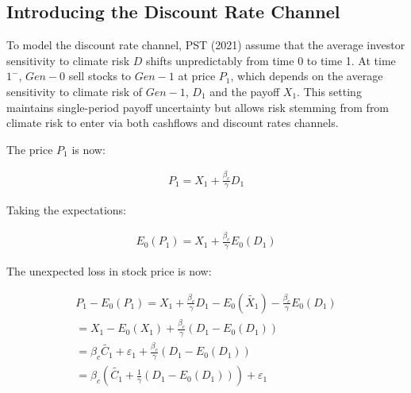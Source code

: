 \subsection{Introducing the Discount Rate Channel}

To model the discount rate channel, PST (2021)
assume that the average investor sensitivity to climate risk 
$D$ shifts unpredictably from time 0 
to time 1. 
At time $1^{-}$, $Gen-0$ sell stocks 
to $Gen-1$ at price $P_1$, which depends 
on the average sensitivity to climate risk
of $Gen-1$, $D_1$ and the payoff $X_1$.
This setting maintains single-period 
payoff uncertainty but allows risk
stemming from from climate risk to enter 
via both cashflows and discount rates 
channels.

The price $P_1$ is now:

\begin{equation}
    \begin{aligned}
    P_1 = X_1 + \frac{\beta_{c}}{\gamma}D_1
    \end{aligned}
\end{equation}

Taking the expectations:

\begin{equation}
    \begin{aligned}
    E_0(P_1) = X_1 + \frac{\beta_{c}}{\gamma}E_0(D_1) 
    \end{aligned}
\end{equation}

The unexpected loss in stock price is now:

\begin{equation}
    \begin{aligned}
    P_1 - E_0(P_1) = X_1 + \frac{\beta_{c}}{\gamma}D_1 - E_0(\tilde{X_1}) - \frac{\beta_{c}}{\gamma}E_0(D_1) \\
    = X_1 - E_0(X_1) + \frac{\beta_{c}}{\gamma}(D_1 - E_0(D_1)) \\
    = \beta_{c} \tilde{C_1} + \varepsilon_1 + \frac{\beta_{c}}{\gamma}(D_1 - E_0(D_1)) \\
    = \beta_{c}(\tilde{C_1} + \frac{1}{\gamma}(D_1 - E_0(D_1))) + \varepsilon_1
    \end{aligned}
\end{equation}

